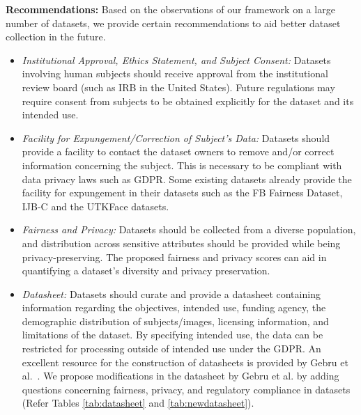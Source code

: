 \documentclass[journal]{IEEEtran}
\begin{document}
\noindent \textbf{Recommendations:} Based on the observations of our framework on a large number of datasets, we provide certain recommendations to aid better dataset collection in the future.
\begin{itemize}
    \item \textit{Institutional Approval, Ethics Statement, and Subject Consent:} Datasets involving human subjects should receive approval from the institutional review board (such as IRB in the United States). Future regulations may require consent from subjects to be obtained explicitly for the dataset and its intended use. 
    \item \textit{Facility for Expungement/Correction of Subject's Data:} Datasets should provide a facility to contact the dataset owners to remove and/or correct information concerning the subject. This is necessary to be compliant with data privacy laws such as GDPR. Some existing datasets already provide the facility for expungement in their datasets such as the FB Fairness Dataset, IJB-C and the UTKFace datasets. 
    \item \textit{Fairness and Privacy:} Datasets should be collected from a diverse population, and distribution across sensitive attributes should be provided while being privacy-preserving. The proposed fairness and privacy scores can aid in quantifying a dataset's diversity and privacy preservation.  
    \item \textit{Datasheet:} Datasets should curate and provide a datasheet containing information regarding the objectives, intended use, funding agency, the demographic distribution of subjects/images, licensing information, and limitations of the dataset. By specifying intended use, the data can be restricted for processing outside of intended use under the GDPR. An excellent resource for the construction of datasheets is provided by Gebru et al.~\cite{gebru2021datasheets}. We propose modifications in the datasheet by Gebru et al. by adding questions concerning fairness, privacy, and regulatory compliance in datasets (Refer Tables \ref{tab:datasheet} and \ref{tab:newdatasheet}).
\end{itemize}
\end{document}
